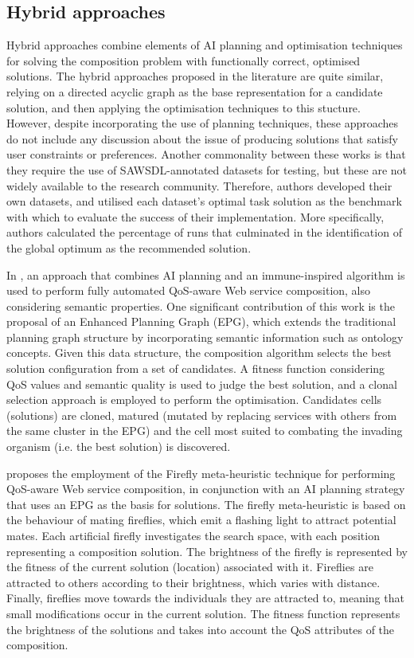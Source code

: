 \documentclass[conference]{IEEEtran}
\begin{document}
\subsection{Hybrid approaches}
Hybrid approaches combine elements of AI planning and optimisation techniques for solving the composition problem with functionally correct, optimised solutions. The hybrid approaches proposed in the literature are quite similar, relying on a directed acyclic graph as the base representation for a candidate solution, and then applying the optimisation techniques to this stucture. However, despite incorporating the use of planning techniques, these approaches do not include any discussion about the issue of producing solutions that satisfy user constraints or preferences. Another commonality between these works is that they require the use of SAWSDL-annotated datasets for testing, but these are not widely available to the research community. Therefore, authors developed their own datasets, and utilised each dataset's optimal task solution as the benchmark with which to evaluate the success of their implementation. More specifically, authors calculated the percentage of runs that culminated in the identification of the global optimum  as the recommended solution.

In \cite{pop2010immune}, an approach that combines AI planning and an immune-inspired algorithm is used to perform fully automated QoS-aware Web service composition, also considering
semantic properties. One significant contribution of this work is the proposal of an Enhanced Planning Graph (EPG), which extends the traditional planning graph structure
by incorporating semantic information such as ontology concepts. Given this data structure, the composition algorithm selects the best solution configuration from a set of candidates. A fitness function considering QoS values and semantic quality is used to judge the best solution, and a clonal selection approach is employed to perform the optimisation. Candidates cells (solutions) are cloned, matured (mutated by replacing services with others from the same cluster in the EPG) and the cell most suited to combating the invading organism (i.e. the best solution) is discovered.

\cite{pop2011hybrid} proposes the employment of the Firefly meta-heuristic technique for performing QoS-aware Web service composition, in conjunction with an AI planning strategy that uses an EPG as the basis for solutions. The firefly meta-heuristic is based on the behaviour of mating fireflies, which emit a flashing light to attract potential mates. Each artificial firefly investigates the search space, with each position representing a composition solution. The brightness of the firefly is represented by the fitness of the current solution (location) associated with it. Fireflies are attracted to others according to their brightness, which varies with distance. Finally, fireflies move towards the individuals they are attracted to, meaning that small modifications occur in the current solution. The fitness function represents the brightness of the solutions and takes into account the QoS attributes of the composition.
\end{document}
